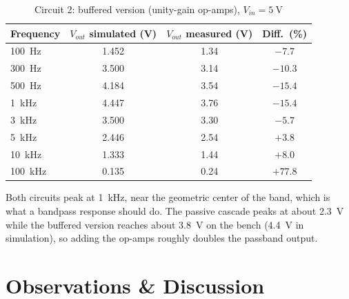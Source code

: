 \documentclass[11pt]{article}
\begin{document}
\begin{table}[H]
    \centering
    \caption{Circuit 2: buffered version (unity-gain op-amps), \(V_{in} = \SI{5}{\volt}\)}
    \begin{tabular}{lccc}
        \toprule
        Frequency & \(V_{out}\) simulated (V) & \(V_{out}\) measured (V) & Diff.\ (\%) \\
        \midrule
        \SI{100}{\hertz}   & 1.452 & 1.34 & $-7.7$ \\
        \SI{300}{\hertz}   & 3.500 & 3.14 & $-10.3$ \\
        \SI{500}{\hertz}   & 4.184 & 3.54 & $-15.4$ \\
        \SI{1}{\kilo\hertz}   & 4.447 & 3.76 & $-15.4$ \\
        \SI{3}{\kilo\hertz}   & 3.500 & 3.30 & $-5.7$ \\
        \SI{5}{\kilo\hertz}   & 2.446 & 2.54 & $+3.8$ \\
        \SI{10}{\kilo\hertz}  & 1.333 & 1.44 & $+8.0$ \\
        \SI{100}{\kilo\hertz} & 0.135 & 0.24 & $+77.8$ \\
        \bottomrule
    \end{tabular}
\end{table}

Both circuits peak at \SI{1}{\kilo\hertz}, near the geometric center of the band, which
is what a bandpass response should do. The passive cascade peaks at about
\SI{2.3}{\volt} while the buffered version reaches about \SI{3.8}{\volt} on the bench
(\SI{4.4}{\volt} in simulation), so adding the op-amps roughly doubles the passband
output.

\section*{Observations \& Discussion}
\end{document}

